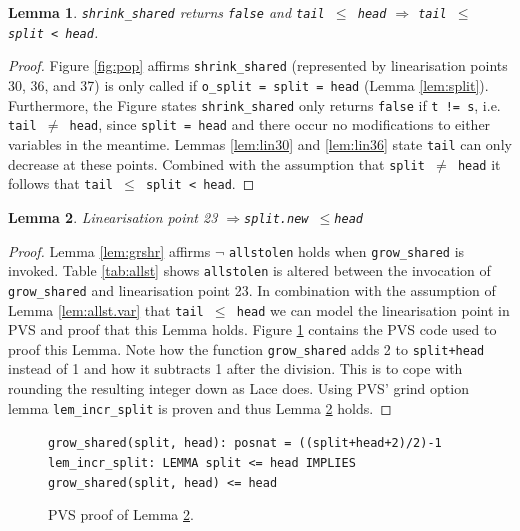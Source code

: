 \documentclass{sig-alternate-br}
\newtheorem{lemma}{Lemma}
\begin{document}
\begin{lemma}
	\texttt{shrink\_shared} returns \texttt{false} and \texttt{tail $\leq$ head} $\Rightarrow$ \texttt{tail $\leq$ split < head}.
	\label{lem:shrsh.var}
\end{lemma}
\begin{proof}
	Figure \ref{fig:pop} affirms \texttt{shrink\_shared} (represented by linearisation points 30, 36, and 37) is only called if \texttt{o\_split = split = head} (Lemma \ref{lem:split}).
	Furthermore, the Figure states \texttt{shrink\_shared} only returns \texttt{false} if \texttt{t != s}, i.e. \texttt{tail $\neq$ head}, since \texttt{split = head} and there occur no modifications to either variables in the meantime.
	Lemmas \ref{lem:lin30} and \ref{lem:lin36} state \texttt{tail} can only decrease at these points. 
	Combined with the assumption that \texttt{split $\neq$ head} it follows that \texttt{tail $\leq$ split < head}.
\end{proof}

\begin{lemma}
	Linearisation point 23 $\Rightarrow$\texttt{split.new $\leq$head}
	\label{lem:lin23}
\end{lemma}
\begin{proof}
	Lemma \ref{lem:grshr} affirms $\neg$ \texttt{allstolen} holds when \texttt{grow\_shared} is invoked.
	Table \ref{tab:allst} shows \texttt{allstolen} is altered between the invocation of \texttt{grow\_shared} and linearisation point 23.
	In combination with the assumption of Lemma \ref{lem:allst.var} that \texttt{tail $\leq$ head} we can model the linearisation point in PVS and proof that this Lemma holds.
	Figure \ref{pvs:lin23} contains the PVS code used to proof this Lemma.
	Note how the function \texttt{grow\_shared} adds 2 to \texttt{split+head} instead of 1 and how it subtracts 1 after the division.
	This is to cope with rounding the resulting integer down as Lace does.
	Using PVS' grind option lemma \texttt{lem\_incr\_split} is proven and thus Lemma \ref{lem:lin23} holds.
\end{proof}
\begin{figure}[h]
	\texttt{grow\_shared(split, head): posnat = ((split+head+2)/2)-1}\\
	\texttt{lem\_incr\_split: LEMMA split <= head IMPLIES grow\_shared(split, head) <= head}
	\caption{PVS proof of Lemma \ref{lem:lin23}.}
	\label{pvs:lin23}
\end{figure}
\end{document}
